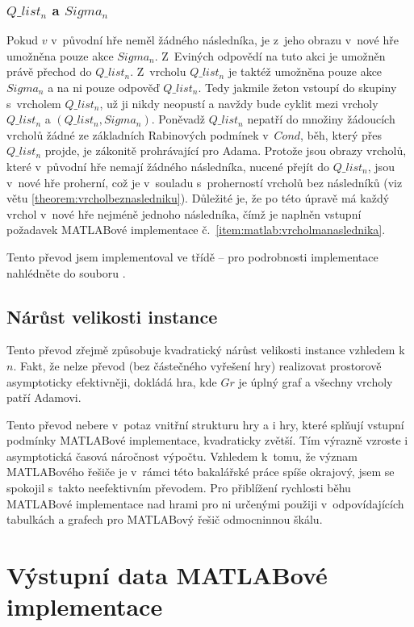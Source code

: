 \begin{informal}
\subsubsection{$Q\_list_n$ a $Sigma_n$}
Pokud $v$ v~původní hře neměl žádného následníka, je z~jeho obrazu v~nové hře umožněna pouze akce $Sigma_n$. Z~Eviných odpovědí na tuto akci je umožněn právě přechod do $Q\_list_n$. Z~vrcholu $Q\_list_n$ je taktéž umožněna pouze akce $Sigma_n$ a na ni pouze odpověď $Q\_list_n$. Tedy jakmile žeton vstoupí do skupiny s~vrcholem $Q\_list_n$, už ji nikdy neopustí a navždy bude cyklit mezi vrcholy $Q\_list_n$ a $(Q\_list_n, Sigma_n)$. Poněvadž $Q\_list_n$ nepatří do množiny žádoucích vrcholů žádné ze základních Rabinových podmínek v~$Cond$, běh, který přes $Q\_list_n$ projde, je zákonitě prohrávající pro Adama. Protože jsou obrazy vrcholů, které v~původní hře nemají žádného následníka, nucené přejít do $Q\_list_n$, jsou v~nové hře proherní, což je v~souladu s~proherností vrcholů bez následníků (viz větu \ref{theorem:vrcholbeznasledniku}). Důležité je, že po této úpravě má každý vrchol v~nové hře nejméně jednoho následníka, čímž je naplněn vstupní požadavek MATLABové implementace č.~\ref{item:matlab:vrcholmanaslednika}.
\end{informal}

Tento převod jsem implementoval ve třídě  -- pro podrobnosti implementace nahlédněte do souboru .
\subsection{Nárůst velikosti instance}
\label{sec:matlab:prevod:narustvelikostiinstance}
Tento převod zřejmě způsobuje kvadratický nárůst velikosti instance vzhledem k~$n$. Fakt, že nelze převod (bez částečného vyřešení hry) realizovat prostorově asymptoticky efektivněji, dokládá hra, kde $Gr$ je úplný graf a všechny vrcholy patří Adamovi.

Tento převod nebere v~potaz vnitřní strukturu hry a i hry, které splňují vstupní podmínky MATLABové implementace, kvadraticky zvětší. Tím výrazně vzroste i asymptotická časová náročnost výpočtu. Vzhledem k~tomu, že význam MATLABového řešiče je v~rámci této bakalářské práce spíše okrajový, jsem se spokojil s~takto neefektivním převodem. Pro přiblížení rychlosti běhu MATLABové implementace nad hrami pro ni určenými použiji v~odpovídajících tabulkách a grafech pro MATLABový řešič odmocninnou škálu.
\section{Výstupní data MATLABové implementace}
